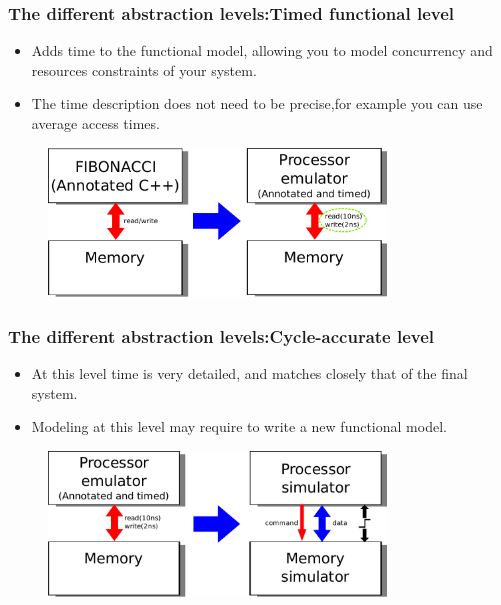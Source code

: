 {\begin{frame}
	\frametitle{The different abstraction levels:\newline Timed functional level}
	\begin{itemize}
		\item<1-> Adds time to the functional model, allowing you to model concurrency and resources constraints of your system. 
		\item<1-> The time description does not need to be precise,for example you can use average access times.
	\end{itemize}
	\begin{figure}[h]
		\includegraphics[width=0.8\textwidth]{introduction/figures/fibonacci_functional_to_timed_level.pdf}
	\end{figure}
\end{frame}

\begin{frame}
	\frametitle{The different abstraction levels:\newline Cycle-accurate level}
	\begin{itemize}
		\item<1-> At this level time is very detailed, and matches closely that of the final system.
		\item<1-> Modeling at this level may require to write a new functional model.
	\end{itemize}
	\begin{figure}[h]
		\includegraphics[width=0.8\textwidth]{introduction/figures/fibonacci_timed_to_cycle_level.pdf}
	\end{figure}
\end{frame}

}
